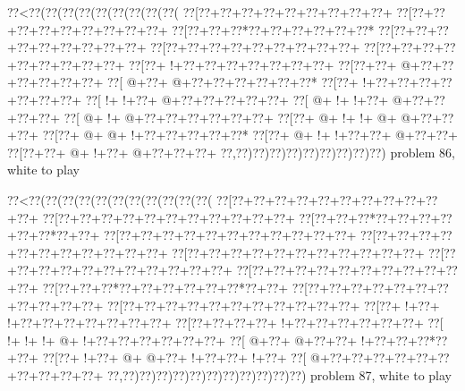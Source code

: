 \vbox{\vbox{\goo
\0??<\0??(\0??(\0??(\0??(\0??(\0??(\0??(\0??(\0??(
\0??[\0??+\0??+\0??+\0??+\0??+\0??+\0??+\0??+\0??+
\0??[\0??+\0??+\0??+\0??+\0??+\0??+\0??+\0??+\0??+
\0??[\0??+\0??+\0??*\0??+\0??+\0??+\0??+\0??+\0??*
\0??[\0??+\0??+\0??+\0??+\0??+\0??+\0??+\0??+\0??+
\0??[\0??+\0??+\0??+\0??+\0??+\0??+\0??+\0??+\0??+
\0??[\0??+\0??+\0??+\0??+\0??+\0??+\0??+\0??+\0??+
\0??[\0??+\- !+\0??+\0??+\0??+\0??+\0??+\0??+\0??+
\0??[\0??+\0??+\- @+\0??+\0??+\0??+\0??+\0??+\0??+
\0??[\- @+\0??+\- @+\0??+\0??+\0??+\0??+\0??+\0??*
\0??[\0??+\- !+\0??+\0??+\0??+\0??+\0??+\0??+\0??+
\0??[\- !+\- !+\0??+\- @+\0??+\0??+\0??+\0??+\0??+
\0??[\- @+\- !+\- !+\0??+\- @+\0??+\0??+\0??+\0??+
\0??[\- @+\- !+\- @+\0??+\0??+\0??+\0??+\0??+\0??+
\0??[\0??+\- @+\- !+\- !+\- @+\- @+\0??+\0??+\0??+
\0??[\0??+\- @+\- @+\- !+\0??+\0??+\0??+\0??+\0??*
\0??[\0??+\- @+\- !+\- !+\0??+\0??+\- @+\0??+\0??+
\0??[\0??+\0??+\- @+\- !+\0??+\- @+\0??+\0??+\0??+
\0??,\0??)\0??)\0??)\0??)\0??)\0??)\0??)\0??)\0??)
}
\hfil problem 86, white to play\hfil\break
}

\vbox{\vbox{\goo
\0??<\0??(\0??(\0??(\0??(\0??(\0??(\0??(\0??(\0??(\0??(\0??(
\0??[\0??+\0??+\0??+\0??+\0??+\0??+\0??+\0??+\0??+\0??+\0??+
\0??[\0??+\0??+\0??+\0??+\0??+\0??+\0??+\0??+\0??+\0??+\0??+
\0??[\0??+\0??+\0??*\0??+\0??+\0??+\0??+\0??+\0??*\0??+\0??+
\0??[\0??+\0??+\0??+\0??+\0??+\0??+\0??+\0??+\0??+\0??+\0??+
\0??[\0??+\0??+\0??+\0??+\0??+\0??+\0??+\0??+\0??+\0??+\0??+
\0??[\0??+\0??+\0??+\0??+\0??+\0??+\0??+\0??+\0??+\0??+\0??+
\0??[\0??+\0??+\0??+\0??+\0??+\0??+\0??+\0??+\0??+\0??+\0??+
\0??[\0??+\0??+\0??+\0??+\0??+\0??+\0??+\0??+\0??+\0??+\0??+
\0??[\0??+\0??+\0??*\0??+\0??+\0??+\0??+\0??+\0??*\0??+\0??+
\0??[\0??+\0??+\0??+\0??+\0??+\0??+\0??+\0??+\0??+\0??+\0??+
\0??[\0??+\0??+\0??+\0??+\0??+\0??+\0??+\0??+\0??+\0??+\0??+
\0??[\0??+\- !+\0??+\- !+\0??+\0??+\0??+\0??+\0??+\0??+\0??+
\0??[\0??+\0??+\0??+\0??+\- !+\0??+\0??+\0??+\0??+\0??+\0??+
\0??[\- !+\- !+\- !+\- @+\- !+\0??+\0??+\0??+\0??+\0??+\0??+
\0??[\- @+\0??+\- @+\0??+\0??+\- !+\0??+\0??+\0??*\0??+\0??+
\0??[\0??+\- !+\0??+\- @+\- @+\0??+\- !+\0??+\0??+\- !+\0??+
\0??[\- @+\0??+\0??+\0??+\0??+\0??+\0??+\0??+\0??+\0??+\0??+
\0??,\0??)\0??)\0??)\0??)\0??)\0??)\0??)\0??)\0??)\0??)\0??)
}
\hfil problem 87, white to play\hfil\break
}

